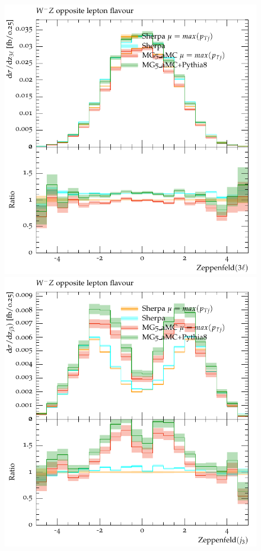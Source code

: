 \documentclass[11pt]{cernrep}
\begin{document}
\begin{figure}[htbp]
\begin{center}
   \includegraphics[scale=0.65]{figs/dyn_WmZ_OF_zep3l}
   \includegraphics[scale=0.65]{figs/dyn_WmZ_OF_zepj3}

\end{center}
\end{figure}
\end{document}
